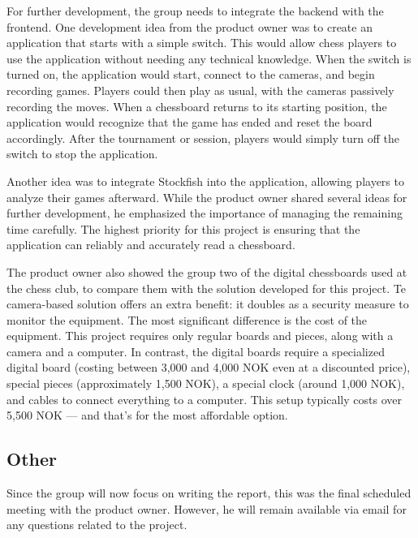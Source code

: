 For further development, the group needs to integrate the backend with the frontend. One development idea from the product owner was to create an application that starts with a simple switch. This would allow chess players to use the application without needing any technical knowledge. When the switch is turned on, the application would start, connect to the cameras, and begin recording games. Players could then play as usual, with the cameras passively recording the moves. When a chessboard returns to its starting position, the application would recognize that the game has ended and reset the board accordingly. After the tournament or session, players would simply turn off the switch to stop the application.

Another idea was to integrate Stockfish into the application, allowing players to analyze their games afterward. While the product owner shared several ideas for further development, he emphasized the importance of managing the remaining time carefully. The highest priority for this project is ensuring that the application can reliably and accurately read a chessboard.

The product owner also showed the group two of the digital chessboards used at the chess club, to compare them with the solution developed for this project. Te camera-based solution offers an extra benefit: it doubles as a security measure to monitor the equipment. The most significant difference is the cost of the equipment. This project requires only regular boards and pieces, along with a camera and a computer. In contrast, the digital boards require a specialized digital board (costing between 3,000 and 4,000 NOK even at a discounted price), special pieces (approximately 1,500 NOK), a special clock (around 1,000 NOK), and cables to connect everything to a computer. This setup typically costs over 5,500 NOK — and that’s for the most affordable option. 

\subsection{Other} 
Since the group will now focus on writing the report, this was the final scheduled meeting with the product owner. However, he will remain available via email for any questions related to the project.